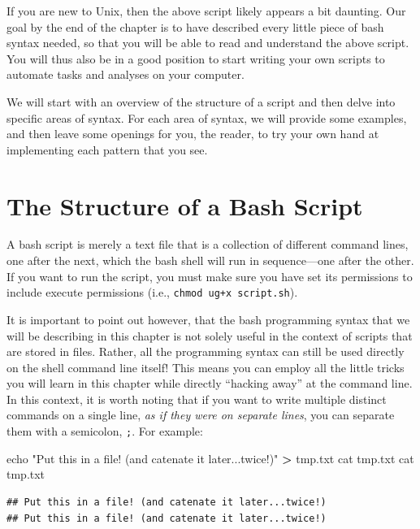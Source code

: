 \documentclass[]{krantz}
\makeatletter
\newenvironment{Shaded}{\begin{snugshade}}{\end{snugshade}}
\newcommand{\BuiltInTok}[1]{#1}
\newcommand{\FunctionTok}[1]{\textcolor[rgb]{0,0,0}{#1}}
\newcommand{\NormalTok}[1]{#1}
\newcommand{\OperatorTok}[1]{\textcolor[rgb]{0.43,0.43,0.43}{\textbf{#1}}}
\newcommand{\StringTok}[1]{\textcolor[rgb]{0.5,0.5,0.5}{#1}}
\newenvironment{kframe}{%
\medskip{}
\setlength{\fboxsep}{.8em}
 \def\at@end@of@kframe{}%
 \ifinner\ifhmode%
  \def\at@end@of@kframe{\end{minipage}}%
  \begin{minipage}{\columnwidth}%
 \fi\fi%
 \def\FrameCommand##1{\hskip\@totalleftmargin \hskip-\fboxsep
 \colorbox{shadecolor}{##1}\hskip-\fboxsep
     \hskip-\linewidth \hskip-\@totalleftmargin \hskip\columnwidth}%
 \MakeFramed {\advance\hsize-\width
   \@totalleftmargin\z@ \linewidth\hsize
   \@setminipage}}%
 {\par\unskip\endMakeFramed%
 \at@end@of@kframe}
\renewenvironment{Shaded}{\begin{kframe}}{\end{kframe}}
\makeatother
\begin{document}
If you are new to Unix, then the above script likely appears a bit daunting.
Our goal by the end of the chapter is to have described every little piece
of bash syntax needed, so that you will be able to read and understand the
above script. You will thus also be in a good position to start
writing your own scripts to automate tasks and analyses
on your computer.

We will start with an overview of the structure of a script and then
delve into specific areas of syntax. For each area of syntax, we will
provide some examples, and then leave some openings for you, the reader,
to try your own hand at implementing each pattern that you see.

\hypertarget{the-structure-of-a-bash-script}{%
\section{The Structure of a Bash Script}\label{the-structure-of-a-bash-script}}

A bash script is merely a text file that is a collection of different command lines, one
after the next, which the bash shell will run in sequence---one after
the other. If you want to run the script, you must make sure you have set its
permissions to include execute permissions (i.e., \texttt{chmod\ ug+x\ script.sh}).

It is important to point out however, that the bash programming syntax that
we will be describing in this chapter is not solely useful in the context
of scripts that are stored in files. Rather, all the programming syntax can still
be used directly on the shell command line itself! This means you can employ
all the little tricks you will learn in this chapter while directly ``hacking away''
at the command line. In this context, it is worth noting that if you want to
write multiple distinct commands on a single line, \emph{as if they were on separate lines},
you can separate them with a semicolon, \texttt{;}. For example:

\begin{Shaded}
\begin{Highlighting}[]
\BuiltInTok{echo} \StringTok{"Put this in a file! (and catenate it later...twice!)"} \OperatorTok{>}\NormalTok{ tmp.txt}
\FunctionTok{cat}\NormalTok{ tmp.txt}
\FunctionTok{cat}\NormalTok{ tmp.txt}
\end{Highlighting}
\end{Shaded}

\begin{verbatim}
## Put this in a file! (and catenate it later...twice!)
## Put this in a file! (and catenate it later...twice!)
\end{verbatim}
\end{document}
